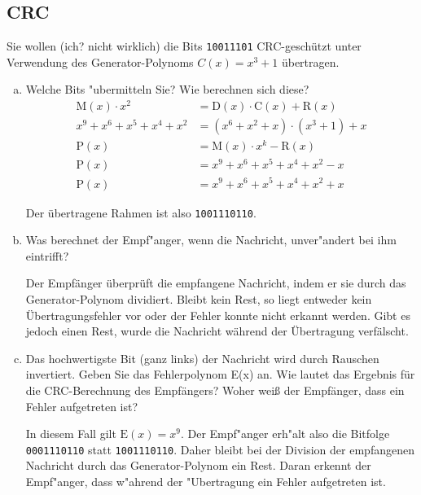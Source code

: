 \setcounter{section}{3}
\setcounter{subsection}{4} %
\subsection{CRC}

Sie wollen (ich? nicht wirklich) die Bits \verb|10011101| CRC-geschützt unter
Verwendung des Generator-Polynoms $C(x) = x^3 + 1$ übertragen.
\begin{enumerate}[(a)]
    \item Welche Bits "ubermitteln Sie? Wie berechnen sich diese?
        \begin{align*}
            \text{M}(x) \cdot x^2       &= \text{D}(x) \cdot \text{C}(x) + \text{R}(x) \\
            x^9 + x^6 + x^5 + x^4 + x^2 &= (x^6 + x^2 + x) \cdot (x^3 + 1) + x \\[10pt]
            \text{P}(x)                 &= \text{M}(x) \cdot x^k - \text{R}(x) \\
            \text{P}(x)                 &= x^9 + x^6 + x^5 + x^4 + x^2 - x \\
            \text{P}(x)                 &= x^9 + x^6 + x^5 + x^4 + x^2 + x
        \end{align*}

        Der übertragene Rahmen ist also \verb|1001110110|.

    \item Was berechnet der Empf"anger, wenn die Nachricht, unver"andert bei ihm eintrifft?

        Der Empfänger überprüft die empfangene Nachricht, indem er sie durch
        das Generator-Polynom dividiert. Bleibt kein Rest, so liegt entweder kein
        Übertragungsfehler vor oder der Fehler konnte nicht erkannt werden.
        Gibt es jedoch einen Rest, wurde die Nachricht während der Übertragung
        verfälscht.

    \item Das hochwertigste Bit (ganz links) der Nachricht wird durch Rauschen
        invertiert. Geben Sie das Fehlerpolynom E(x) an. Wie lautet das
        Ergebnis für die CRC-Berechnung des Empfängers? Woher weiß der
        Empfänger, dass ein Fehler aufgetreten ist?

        In diesem Fall gilt $\text{E}(x) = x^9$. Der Empf"anger erh"alt also
        die Bitfolge \verb|0001110110| statt \verb|1001110110|. Daher bleibt
        bei der Division der empfangenen Nachricht durch das Generator-Polynom
        ein Rest. Daran erkennt der Empf"anger, dass w"ahrend der "Ubertragung ein
        Fehler aufgetreten ist.


\end{enumerate}
